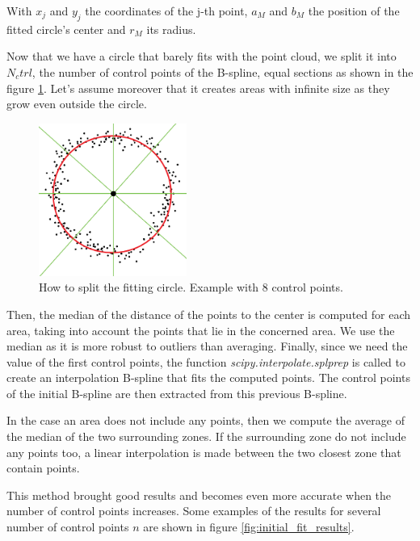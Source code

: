 \documentclass{article}
\newcommand{\vsp}{\vspace{\baselineskip}}
\begin{document}
With $x_j$ and $y_j$ the coordinates of the j-th point, $a_M$ and $b_M$ the position of the fitted circle's center and $r_M$ its radius. 

\vsp

Now that we have a circle that barely fits with the point cloud, we split it into $N_ctrl$, the number of control points of the B-spline, equal sections as shown in the figure \ref{fig:split_circle}. Let's assume moreover that it creates areas with infinite size as they grow even outside the circle.

\begin{figure}[H]
    \centering
    \includegraphics[height = 5cm]{images/circle_split.png}
    \caption[How to split the fitting circle]{How to split the fitting circle. Example with 8 control points.}
    \label{fig:split_circle}
\end{figure}

Then, the median of the distance of the points to the center is computed for each area, taking into account the points that lie in the concerned area. We use the median as it is more robust to outliers than averaging. Finally, since we need the value of the first control points, the function \textit{scipy.interpolate.splprep} is called to create an interpolation B-spline that fits the computed points. The control points of the initial B-spline are then extracted from this previous B-spline.

\vsp

In the case an area does not include any points, then we compute the average of the median of the two surrounding zones. If the surrounding zone do not include any points too, a linear interpolation is made between the two closest zone that contain points. 

\vsp

This method brought good results and becomes even more accurate when the number of control points increases. Some examples of the results for several number of control points $n$ are shown in figure \ref{fig:initial_fit_results}. 
\end{document}
